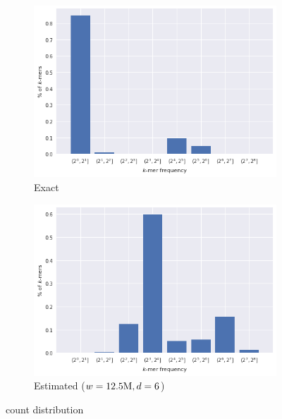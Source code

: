 \begin{figure}[htb]
    \centering
    \begin{subfigure}{.5\textwidth}
        \centering
        \includegraphics[width=\textwidth]{figures/e_coli-kmer_frequencies-exact-K31}
        \caption{Exact}\label{fig:ecoli-art-dbcm-counts-exact}
    \end{subfigure}%
    \begin{subfigure}{.5\textwidth}
        \centering
        \includegraphics[width=\textwidth]{figures/e_coli-kmer_frequencies-estimated-K31-W10000000-D6}
        \caption{Estimated ($w = 12.5\mega, d = 6$)}\label{fig:ecoli-art-dbcm-counts-exact}
    \end{subfigure}
	\caption{\kmer count distribution}\label{fig:ecoli-art-dbcm-counts}
\end{figure}

